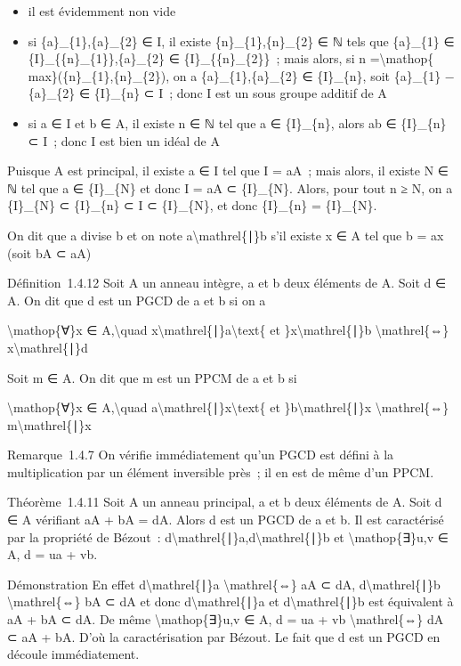 \documentclass[]{article}
\begin{document}
\begin{itemize}
\itemsep1pt\parskip0pt
\item
  il est évidemment non vide
\item
  si \{a\}\_\{1\},\{a\}\_\{2\} ∈ I, il existe \{n\}\_\{1\},\{n\}\_\{2\}
  ∈ ℕ tels que \{a\}\_\{1\} ∈ \{I\}\_\{\{n\}\_\{1\}\},\{a\}\_\{2\} ∈
  \{I\}\_\{\{n\}\_\{2\}\}~; mais alors, si n =\textbackslash{}mathop\{
  max\}(\{n\}\_\{1\},\{n\}\_\{2\}), on a \{a\}\_\{1\},\{a\}\_\{2\} ∈
  \{I\}\_\{n\}, soit \{a\}\_\{1\} − \{a\}\_\{2\} ∈ \{I\}\_\{n\} ⊂ I~;
  donc I est un sous groupe additif de A
\item
  si a ∈ I et b ∈ A, il existe n ∈ ℕ tel que a ∈ \{I\}\_\{n\}, alors ab
  ∈ \{I\}\_\{n\} ⊂ I~; donc I est bien un idéal de A
\end{itemize}

Puisque A est principal, il existe a ∈ I tel que I = aA~; mais alors, il
existe N ∈ ℕ tel que a ∈ \{I\}\_\{N\} et donc I = aA ⊂ \{I\}\_\{N\}.
Alors, pour tout n ≥ N, on a \{I\}\_\{N\} ⊂ \{I\}\_\{n\} ⊂ I ⊂
\{I\}\_\{N\}, et donc \{I\}\_\{n\} = \{I\}\_\{N\}.

On dit que a divise b et on note a\textbackslash{}mathrel\{∣\}b s'il
existe x ∈ A tel que b = ax (soit bA ⊂ aA)

Définition~1.4.12 Soit A un anneau intègre, a et b deux éléments de A.
Soit d ∈ A. On dit que d est un PGCD de a et b si on a

\textbackslash{}mathop\{∀\}x ∈ A,\textbackslash{}quad
x\textbackslash{}mathrel\{∣\}a\textbackslash{}text\{ et
\}x\textbackslash{}mathrel\{∣\}b \textbackslash{}mathrel\{⇔\}
x\textbackslash{}mathrel\{∣\}d

Soit m ∈ A. On dit que m est un PPCM de a et b si

\textbackslash{}mathop\{∀\}x ∈ A,\textbackslash{}quad
a\textbackslash{}mathrel\{∣\}x\textbackslash{}text\{ et
\}b\textbackslash{}mathrel\{∣\}x \textbackslash{}mathrel\{⇔\}
m\textbackslash{}mathrel\{∣\}x

Remarque~1.4.7 On vérifie immédiatement qu'un PGCD est défini à la
multiplication par un élément inversible près~; il en est de même d'un
PPCM.

Théorème~1.4.11 Soit A un anneau principal, a et b deux éléments de A.
Soit d ∈ A vérifiant aA + bA = dA. Alors d est un PGCD de a et b. Il est
caractérisé par la propriété de Bézout~:
d\textbackslash{}mathrel\{∣\}a,d\textbackslash{}mathrel\{∣\}b et
\textbackslash{}mathop\{∃\}u,v ∈ A, d = ua + vb.

Démonstration En effet d\textbackslash{}mathrel\{∣\}a
\textbackslash{}mathrel\{⇔\} aA ⊂ dA, d\textbackslash{}mathrel\{∣\}b
\textbackslash{}mathrel\{⇔\} bA ⊂ dA et donc
d\textbackslash{}mathrel\{∣\}a et d\textbackslash{}mathrel\{∣\}b est
équivalent à aA + bA ⊂ dA. De même \textbackslash{}mathop\{∃\}u,v ∈ A, d
= ua + vb \textbackslash{}mathrel\{⇔\} dA ⊂ aA + bA. D'où la
caractérisation par Bézout. Le fait que d est un PGCD en découle
immédiatement.
\end{document}

